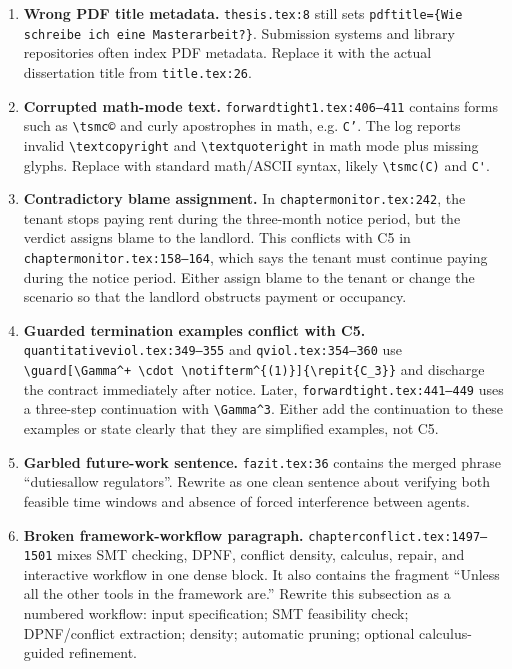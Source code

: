 \documentclass[11pt,a4paper]{article}
\newcommand{\sev}[1]{\textbf{#1}}
\newcommand{\loc}[1]{\texttt{#1}}
\begin{document}
\begin{enumerate}
  \item \sev{Wrong PDF title metadata.} \loc{thesis.tex:8} still sets
  \verb|pdftitle={Wie schreibe ich eine Masterarbeit?}|. Submission systems and
  library repositories often index PDF metadata. Replace it with the actual
  dissertation title from \loc{title.tex:26}.

  \item \sev{Corrupted math-mode text.} \loc{forwardtight1.tex:406--411} contains
  forms such as \verb|\tsmc©| and curly apostrophes in math, e.g. \verb|C’|.
  The log reports invalid \verb|\textcopyright| and \verb|\textquoteright| in math
  mode plus missing glyphs. Replace with standard math/ASCII syntax, likely
  \verb|\tsmc(C)| and \verb|C'|.

  \item \sev{Contradictory blame assignment.} In \loc{chaptermonitor.tex:242}, the
  tenant stops paying rent during the three-month notice period, but the verdict
  assigns blame to the landlord. This conflicts with C5 in
  \loc{chaptermonitor.tex:158--164}, which says the tenant must continue paying
  during the notice period. Either assign blame to the tenant or change the scenario
  so that the landlord obstructs payment or occupancy.

  \item \sev{Guarded termination examples conflict with C5.}
  \loc{quantitativeviol.tex:349--355} and \loc{qviol.tex:354--360} use
  \verb|\guard[\Gamma^+ \cdot \notifterm^{(1)}]{\repit{C_3}}| and discharge the
  contract immediately after notice. Later, \loc{forwardtight.tex:441--449} uses
  a three-step continuation with \verb|\Gamma^3|. Either add the continuation to
  these examples or state clearly that they are simplified examples, not C5.

  \item \sev{Garbled future-work sentence.} \loc{fazit.tex:36} contains the merged
  phrase ``dutiesallow regulators''. Rewrite as one clean sentence about verifying
  both feasible time windows and absence of forced interference between agents.

  \item \sev{Broken framework-workflow paragraph.} \loc{chapterconflict.tex:1497--1501}
  mixes SMT checking, DPNF, conflict density, calculus, repair, and interactive
  workflow in one dense block. It also contains the fragment ``Unless all the other
  tools in the framework are.'' Rewrite this subsection as a numbered workflow:
  input specification; SMT feasibility check; DPNF/conflict extraction; density;
  automatic pruning; optional calculus-guided refinement.
\end{enumerate}
\end{document}
